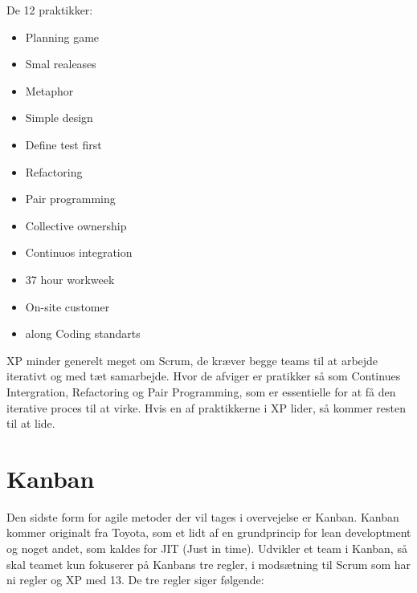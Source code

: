 De 12 praktikker: 



\begin{itemize}
    \item Planning game

    \item Smal realeases
  
    \item Metaphor

    \item Simple design 

    \item Define test first

    \item Refactoring
 
    \item Pair programming

    \item Collective ownership
   
    \item Continuos integration 

    \item 37 hour workweek 

    \item On-site customer 
    
    \item along Coding standarts 


\end{itemize}

XP minder generelt meget om Scrum, de kræver begge teams til at arbejde iterativt og med tæt samarbejde. Hvor de afviger er pratikker så som Continues Intergration, Refactoring og Pair Programming, som er essentielle for at få den iterative proces til at virke. Hvis en af praktikkerne i XP lider, så kommer resten til at lide. 



\section{Kanban}

Den sidste form for agile metoder der vil tages i overvejelse er Kanban. Kanban kommer originalt fra Toyota, som et lidt af en grundprincip for lean developtment og noget andet, som kaldes for JIT (Just in time). \cite{slides} Udvikler et team i Kanban, så skal teamet kun fokuserer på Kanbans tre regler, i modsætning til Scrum som har ni regler og XP med 13.        De tre regler siger følgende: 

